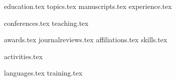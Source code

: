\documentclass[letterpaper,11pt]{article}
\begin{document}


{education.tex}
{topics.tex}
{manuscripts.tex}
{experience.tex}



{conferences.tex}
{teaching.tex}


{awards.tex}
{journalreviews.tex}
{affiliations.tex}
{skills.tex}

{activities.tex}



{languages.tex}
{training.tex}




\end{document}
